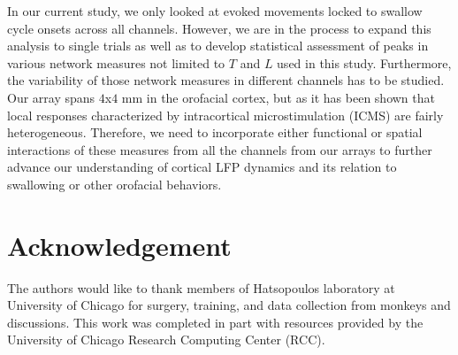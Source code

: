 \documentclass[letterpaper, 9pt, conference]{ieeeconf}
\begin{document}
 In our current study, we only looked at evoked movements locked to swallow cycle onsets across all channels. However, we are in the process to expand this analysis to single trials as well as to develop statistical assessment of peaks in various network measures not limited to $T$ and $L$ used in this study. Furthermore, the variability of those network measures in different channels has to be studied. Our array spans $4$x$4$ mm in the orofacial cortex, but as it has been shown \cite{Hatanaka2005} that local responses characterized by intracortical microstimulation (ICMS) are fairly heterogeneous. Therefore, we need to incorporate either functional or spatial interactions of these measures from all the channels from our arrays to further advance our understanding of cortical LFP dynamics and its relation to swallowing or other orofacial behaviors. 




\section{Acknowledgement}
The authors would like to thank  members of Hatsopoulos laboratory at University of Chicago for surgery,  training, and data collection from monkeys and discussions. This work was completed in part with resources provided by the University of Chicago Research Computing Center (RCC).



\end{document}
